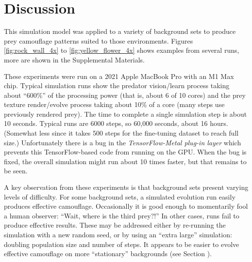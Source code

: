 \documentclass[letterpaper]{article}
\newcommand{\jargon}[1]{\textit{#1}}
\begin{document}
\section{Discussion}
\label{sec:discussion}
This simulation model was applied to a variety of background sets to produce prey camouflage patterns suited to those environments. Figures \ref{fig:rock_wall_4x} to \ref{fig:yellow_flower_4x} shows examples from several runs, more are shown in the Supplemental Materials.
\par
These experiments were run on a 2021 Apple MacBook Pro with an M1 Max chip. Typical simulation runs show the predator vision/learn process taking about “600\%” of the processing power (that is, about 6 of 10 cores) and the prey texture render/evolve process taking about 10\% of a core (many steps use previously rendered prey). The time to complete a single simulation step is about 10 seconds. Typical runs are 6000 steps, so 60,000 seconds, about 16 hours. (Somewhat less since it takes 500 steps for the fine-tuning dataset to reach full size.) Unfortunately there is a bug in the \jargon{TensorFlow-Metal plug-in layer} which prevents this TensorFlow-based code from running on the GPU. When the bug is fixed, the overall simulation might run about 10 times faster, but that remains to be seen.
\par
A key observation from these experiments is that background sets present varying levels of difficulty. For some background sets, a simulated evolution run easily produces effective camouflage. Occasionally it is good enough to momentarily fool a human observer: “Wait, where is the third prey?!” In other cases, runs fail to produce effective results. These may be addressed either by re-running the simulation with a new random seed, or by using an “extra large” simulation: doubling population size and number of steps. It appears to be easier to evolve effective camouflage on more “stationary” backgrounds (see Section ).

\par
\end{document}
